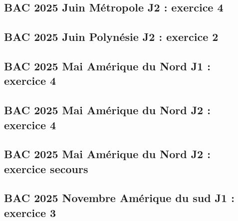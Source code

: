 \documentclass[lang=fr,edition=teacher,layout=sheet]{mxbook}
\begin{document}
\begingroup\endgroup
\par\bigskip
{}\subsection*{BAC 2025 Juin Métropole J2 : exercice 4}
\begingroup\endgroup
\par\bigskip
{}\subsection*{BAC 2025 Juin Polynésie J2 : exercice 2}
\begingroup\endgroup
\par\bigskip
{}\subsection*{BAC 2025 Mai Amérique du Nord J1 : exercice 4}
\begingroup\endgroup
\par\bigskip
{}\subsection*{BAC 2025 Mai Amérique du Nord J2 : exercice 4}
\begingroup\endgroup
\par\bigskip
{}\subsection*{BAC 2025 Mai Amérique du Nord J2 : exercice secours}
\begingroup\endgroup
\par\bigskip
{}\subsection*{BAC 2025 Novembre Amérique du sud J1 : exercice 3}
\begingroup\endgroup
\par\bigskip
\end{document}
